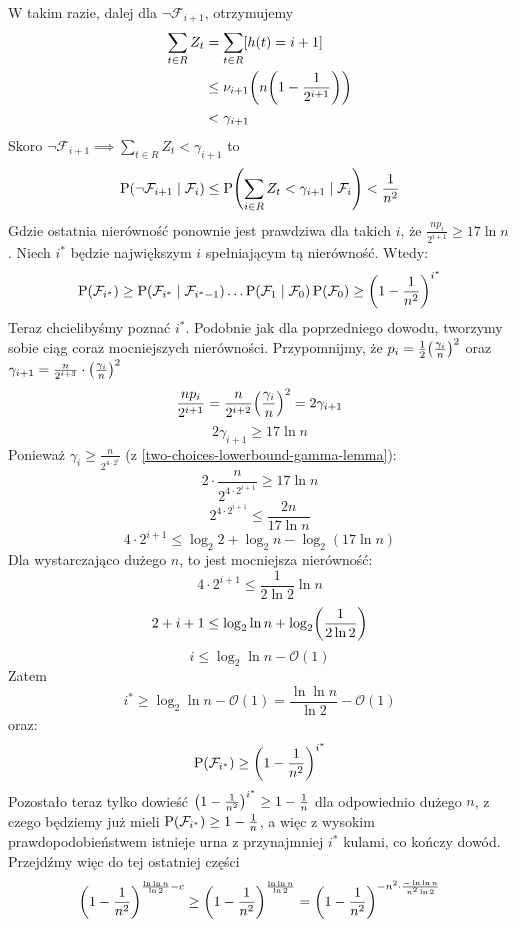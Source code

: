 W takim razie, dalej dla \( \neg\mathcal{F}_{i+1} \), otrzymujemy
\begin{align*}
	\sum_{t \in R} Z_t & = \sum_{t \in R}[h(t) = i + 1]                     \\
	                   & \leq \nu_{i+1}\pars{n\pars{1 - \frac{1}{2^{i+1}}}} \\
	                   & < \gamma_{i+1}
\end{align*}
Skoro \( \neg\mathcal{F}_{i+1} \implies \sum_{t \in R} Z_t < \gamma_{i+1}\) to
\[
	\prob\pars{\neg\mathcal{F}_{i+1} \mid \mathcal{F}_i} \leq \prob\pars{\sum_{i \in R} Z_t < \gamma_{i+1} \mid \mathcal{F}_i} < \frac{1}{n^2}
\]
Gdzie ostatnia nierówność ponownie jest prawdziwa dla takich \( i \), że \( \frac{np_i}{2^{i+1}} \geq 17\ln n\). Niech \( i^* \) będzie największym \( i \) spełniającym tą nierówność. Wtedy:
\[
	\prob\pars{\mathcal{F}_{i^*}} \geq \prob\pars{\mathcal{F}_{i^*} \mid \mathcal{F}_{i^* - 1}} \ldots \prob\pars{\mathcal{F}_1 \mid \mathcal{F}_0}\prob\pars{\mathcal{F}_0} \geq \pars{1 - \frac{1}{n^2}}^{i^*}
\]
Teraz chcielibyśmy poznać \( i^* \). Podobnie jak dla poprzedniego dowodu, tworzymy sobie ciąg coraz mocniejszych nierówności. Przypomnijmy, że \( p_i = \frac{1}{2}\pars{\frac{\gamma_i}{n}}^2 \) oraz \(\gamma_{i+1} = \frac{n}{2^{i+3}} \cdot \left(\frac{\gamma_i}{n}\right)^2\)
\[
	\frac{np_i}{2^{i+1}} = \frac{n}{2^{i+2}} \pars{\frac{\gamma_i}{n}}^2 = 2\gamma_{i+1}
\]
\[
	2\gamma_{i+1} \geq 17\ln n
\]
Ponieważ \( \gamma_i \geq \frac{n}{2^{4\cdot 2 ^i}} \) (z \ref{two-choices-lowerbound-gamma-lemma}):
\[
	2 \cdot \frac{n}{2^{4 \cdot 2^{i+1}}} \geq 17\ln n
\]
\[
	2^{4 \cdot 2 ^{i+1}}  \leq \frac{2n}{17\ln n}
\]
\[
	4 \cdot 2^{i+1} \leq \log_2 2 + \log_2 n - \log_2(17 \ln n)
\]
Dla wystarczająco dużego \(n\), to jest mocniejsza nierówność:
\[
	4 \cdot 2^{i+1} \leq \frac{1}{2\ln 2} \ln n
\]
\[
	2 + i + 1 \leq \log_2 \ln n + \log_2\pars{\frac{1}{2 \ln 2}}
\]
\[
	i \leq \log_2 \ln n - \mathcal{O}(1)
\]
Zatem
\[
	i^* \geq \log_2 \ln n - \mathcal{O}(1) = \frac{\ln \ln n}{\ln 2} - \mathcal{O}(1)
\]
oraz:
\[
	\prob\pars{\mathcal{F}_{i^*}} \geq \pars{1 - \frac{1}{n^2}}^{i^*}
\]
Pozostało teraz tylko dowieść \(\left(1 - \frac{1}{n^2}\right)^{i^*} \geq 1 - \frac{1}{n}\) dla odpowiednio dużego \(n\), z czego będziemy już mieli \(\prob\pars{\mathcal{F}_{i^*}} \geq 1 - \frac{1}{n}\), a więc z wysokim prawdopodobieństwem istnieje urna z przynajmniej \(i^*\) kulami, co kończy dowód. Przejdźmy więc do tej ostatniej części
\[
	\left(1 - \frac{1}{n^2}\right)^{\frac{\ln \ln n}{\ln 2} - c} \geq \left(1 - \frac{1}{n^2}\right)^{\frac{\ln \ln n}{\ln 2}} = \left(1 - \frac{1}{n^2}\right)^{-n^2 \cdot \frac{-\ln \ln n}{n^2 \ln 2}}
\]
